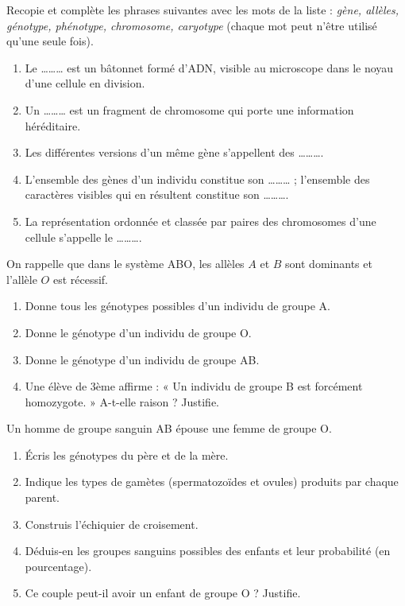 \documentclass[11pt]{article}
\newcounter{popsec}
\newcounter{popsub}
\newcommand{\courssub}[1]{%
  \stepcounter{popsub}%
  \par\vspace{9pt}\noindent{\popxbold\fontsize{11.5}{13}\selectfont\color{popink}{\color{poporange}\thepopsec.\thepopsub}\hspace{6pt}#1}\par\nopagebreak\vspace{4pt}
}
\begin{document}
\begin{exercice}
Recopie et complète les phrases suivantes avec les mots de la liste : \emph{gène, allèles, génotype, phénotype, chromosome, caryotype} (chaque mot peut n'être utilisé qu'une seule fois).
\begin{enumerate}
\item Le \ldots\ldots\ldots{} est un bâtonnet formé d'ADN, visible au microscope dans le noyau d'une cellule en division.
\item Un \ldots\ldots\ldots{} est un fragment de chromosome qui porte une information héréditaire.
\item Les différentes versions d'un même gène s'appellent des \ldots\ldots\ldots{}.
\item L'ensemble des gènes d'un individu constitue son \ldots\ldots\ldots{} ; l'ensemble des caractères visibles qui en résultent constitue son \ldots\ldots\ldots{}.
\item La représentation ordonnée et classée par paires des chromosomes d'une cellule s'appelle le \ldots\ldots\ldots{}.
\end{enumerate}
\end{exercice}

\begin{exercice}
On rappelle que dans le système ABO, les allèles $A$ et $B$ sont dominants et l'allèle $O$ est récessif.
\begin{enumerate}
\item Donne tous les génotypes possibles d'un individu de groupe A.
\item Donne le génotype d'un individu de groupe O.
\item Donne le génotype d'un individu de groupe AB.
\item Une élève de 3ème affirme : « Un individu de groupe B est forcément homozygote. » A-t-elle raison ? Justifie.
\end{enumerate}
\end{exercice}

\courssub{Je m'entraîne}

\begin{exercice}
Un homme de groupe sanguin AB épouse une femme de groupe O.
\begin{enumerate}
\item Écris les génotypes du père et de la mère.
\item Indique les types de gamètes (spermatozoïdes et ovules) produits par chaque parent.
\item Construis l'échiquier de croisement.
\item Déduis-en les groupes sanguins possibles des enfants et leur probabilité (en pourcentage).
\item Ce couple peut-il avoir un enfant de groupe O ? Justifie.
\end{enumerate}
\end{exercice}
\end{document}
